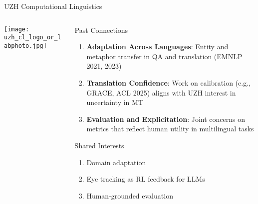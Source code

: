 \documentclass[compress]{beamer}
\begin{document}
\begin{frame}{UZH Computational Linguistics}
\begin{columns}
  \begin{column}{0.45\textwidth}
    \texttt{[image: uzh\_cl\_logo\_or\_labphoto.jpg]} %
  \end{column}
  \begin{column}{0.5\textwidth}
    \begin{block}{Past Connections}
      \begin{enumerate}
        \item \textbf{Adaptation Across Languages}:  
        Entity and metaphor transfer in QA and translation (EMNLP 2021, 2023)

        \item \textbf{Translation Confidence}:  
        Work on calibration (e.g., GRACE, ACL 2025) aligns with UZH interest in uncertainty in MT

        \item \textbf{Evaluation and Explicitation}:  
        Joint concerns on metrics that reflect human utility in multilingual tasks
      \end{enumerate}
    \end{block}

    \begin{block}{Shared Interests}
      \begin{enumerate}
        \item Domain adaptation  
        \item Eye tracking as RL feedback for LLMs 
        \item Human-grounded evaluation
      \end{enumerate}
    \end{block}
  \end{column}
\end{columns}
\end{frame}
\end{document}
